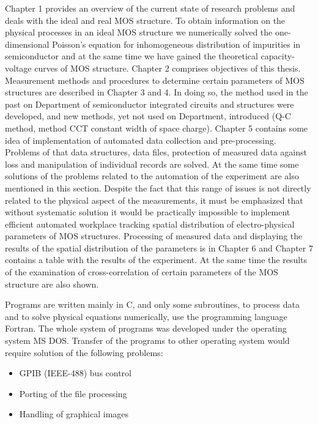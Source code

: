 \par Chapter 1 provides an overview of the current state of research
problems and deals with the ideal and real MOS structure. To obtain
information on the physical processes in an ideal MOS structure we
numerically solved the one-dimensional Poisson's equation for
inhomogeneous distribution of impurities in semiconductor and at the
same time we have gained the theoretical capacity-voltage curves of
MOS structure. Chapter 2 comprises objectives of this
thesis. Measurement methods and procedures to determine certain
parameters of MOS structures are described in Chapter 3 and 4. In
doing so, the method used in the past on Department of semiconductor
integrated circuits and structures were developed, and new methods,
yet not used on Department, introduced (Q-C method, method CCT
constant width of space charge). Chapter 5 contains some idea of
implementation of automated data collection and
pre-processing. Problems of that data structures, data files,
protection of measured data against loss and manipulation of
individual records are solved.  At the same time some solutions of the
problems related to the automation of the experiment are also
mentioned in this section. Despite the fact that this range of issues
is not directly related to the physical aspect of the measurements, it
must be emphasized that without systematic solution it would be
practically impossible to implement efficient automated workplace
tracking spatial distribution of electro-physical parameters of MOS
structures. Processing of measured data and displaying the results of
the spatial distribution of the parameters is in Chapter 6 and Chapter
7 contains a table with the results of the experiment. At the same
time the results of the examination of cross-correlation of certain
parameters of the MOS structure are also shown.

\par Programs are written mainly in C, and only some subroutines, to
process data and to solve physical equations numerically, use the
programming language Fortran. The whole system of programs was
developed under the operating system MS DOS\@. Transfer of the programs
to other operating system would require solution of the following
problems:
\begin{itemize}
\item GPIB (IEEE-488) bus control
\item Porting of the file processing
\item Handling of graphical images
\end{itemize}

